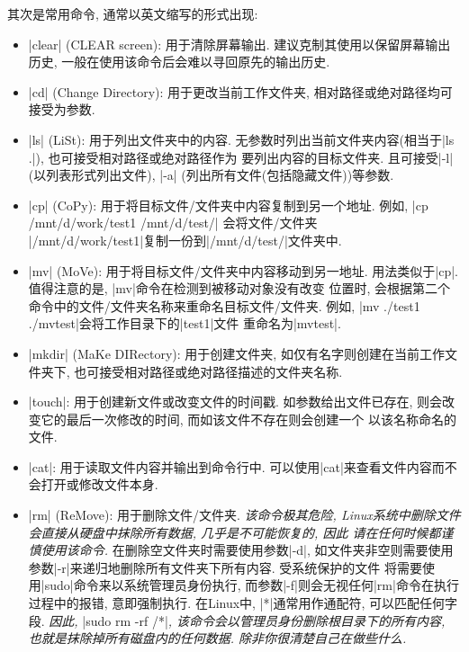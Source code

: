 其次是常用命令, 通常以英文缩写的形式出现:
\begin{itemize}
      \item \cverb|clear| (CLEAR screen): 用于清除屏幕输出. 建议克制其使用以保留屏幕输出历史, 一般在使用该命令后会难以寻回原先的输出历史.
      \item \cverb|cd| (Change Directory): 用于更改当前工作文件夹, 相对路径或绝对路径均可接受为参数.
      \item \cverb|ls| (LiSt): 用于列出文件夹中的内容. 无参数时列出当前文件夹内容(相当于\cverb|ls .|), 也可接受相对路径或绝对路径作为
            要列出内容的目标文件夹. 且可接受\cverb|-l| (以列表形式列出文件), \cverb|-a| (列出所有文件(包括隐藏文件))等参数.
      \item \cverb|cp| (CoPy): 用于将目标文件/文件夹中内容复制到另一个地址. 例如, \cverb|cp /mnt/d/work/test1 /mnt/d/test/|
            会将文件/文件夹\\\cverb|/mnt/d/work/test1|复制一份到\cverb|/mnt/d/test/|文件夹中.
      \item \cverb|mv| (MoVe): 用于将目标文件/文件夹中内容移动到另一地址. 用法类似于\cverb|cp|. 值得注意的是, \cverb|mv|命令在检测到被移动对象没有改变
            位置时, 会根据第二个命令中的文件/文件夹名称来重命名目标文件/文件夹. 例如, \cverb|mv ./test1 ./mvtest|会将工作目录下的\cverb|test1|文件
            重命名为\cverb|mvtest|.
      \item \cverb|mkdir| (MaKe DIRectory): 用于创建文件夹, 如仅有名字则创建在当前工作文件夹下, 也可接受相对路径或绝对路径描述的文件夹名称.
      \item \cverb|touch|: 用于创建新文件或改变文件的时间戳. 如参数给出文件已存在, 则会改变它的最后一次修改的时间, 而如该文件不存在则会创建一个
            以该名称命名的文件.
      \item \cverb|cat|: 用于读取文件内容并输出到命令行中. 可以使用\cverb|cat|来查看文件内容而不会打开或修改文件本身.
      \item \cverb|rm| (ReMove): 用于删除文件/文件夹. \emph{该命令极其危险, Linux系统中删除文件会直接从硬盘中抹除所有数据, 几乎是不可能恢复的, 因此
                  请在任何时候都谨慎使用该命令. }
            在删除空文件夹时需要使用参数\cverb|-d|, 如文件夹非空则需要使用参数\cverb|-r|来递归地删除所有文件夹下所有内容. 受系统保护的文件
            将需要使用\cverb|sudo|命令来以系统管理员身份执行, 而参数\cverb|-f|则会无视任何\cverb|rm|命令在执行过程中的报错, 意即强制执行. 在Linux中,
            \cverb|*|通常用作通配符, 可以匹配任何字段.
            \emph{因此, \color{red}{请永远不要执行命令}}\cverb|sudo rm -rf /*|\emph{, 该命令会以管理员身份删除根目录下的所有内容,
                  也就是抹除掉所有磁盘内的任何数据. 除非你很清楚自己在做些什么. }
\end{itemize}


